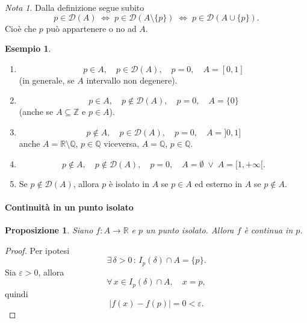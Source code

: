 \documentclass{article}
\theoremstyle{plain}
\newtheorem{prop}[thm]{Proposizione}
\theoremstyle{definition}
\newtheorem{exmp}{Esempio}[section]
\theoremstyle{remark}
\newtheorem{note}{Nota}
\begin{document}
\vspace{10pt}

\begin{note}
    Dalla definizione segue subito 
    \[p\in\mathcal{D}(A)\;\iff\; p\in\mathcal{D}(A\setminus\{p\})\;\iff\; p\in\mathcal{D}(A\cup\{p\}).\] 
    Cioè che $p$ può appartenere o no ad $A$.
\end{note}

\vspace{10pt}

\begin{exmp}
    \begin{enumerate}\hfill
        \item \[p\in A,\quad p\in\mathcal{D}(A),\quad p=0,\quad A=[0,1]\] (in generale, se $A$ intervallo non degenere).
        \item \[p\in A,\quad p\notin\mathcal{D}(A),\quad p=0,\quad A=\{0\}\] (anche se $A\subseteq\mathbb{Z}$ e $p\in A$).
        \item \[p\notin A,\quad p\in\mathcal{D}(A),\quad p=0,\quad A=]0,1]\] anche $A=\mathbb{R}\setminus \mathbb{Q}$, $p\in\mathbb{Q}$ viceversa, $A=\mathbb{Q}$, $p\in\mathbb{Q}$.
        \item \[p\notin A,\quad p\notin\mathcal{D}(A),\quad p=0,\quad A=\emptyset\;\lor\; A=[1,+\infty[.\]
        \item Se $p\notin\mathcal{D}(A)$, allora $p$ è isolato in $A$ se $p\in A$ ed esterno in $A$ se $p\notin A$.
    \end{enumerate}
\end{exmp}

\vspace{10pt}

\paragraph{Continuità in un punto isolato}
\begin{bxthm}
\begin{prop}
    Siano $f:A\to\mathbb{R}$ e $p$ un punto isolato. Allora $f$ è continua in $p$.
\end{prop}
\end{bxthm}
\begin{proof}
    Per ipotesi \[\exists\,\delta>0\,:\,I_p(\delta)\cap A=\{p\}.\]
    Sia $\varepsilon>0$, allora \[\forall\, x\in I_p(\delta)\cap A,\quad x=p,\] quindi \[|f(x)-f(p)|=0<\varepsilon.\]
\end{proof}

\vspace{10pt}
\end{document}
